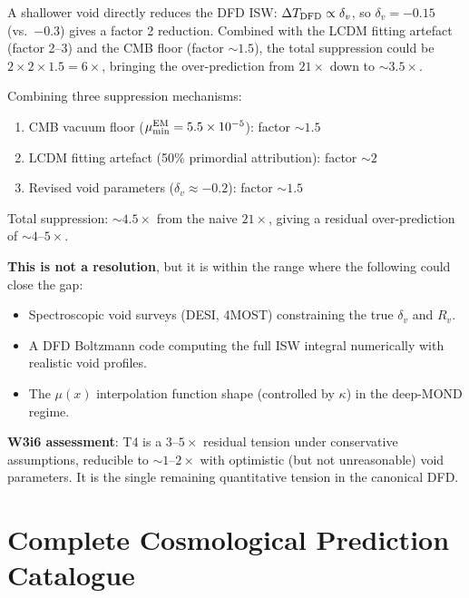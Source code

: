\documentclass[11pt]{article}
\newcommand{\ee}[1]{\times 10^{#1}}
\newcommand{\mufd}{\mu}
\newcommand{\mumin}{\mu_{\rm min}}
\begin{document}
A shallower void directly reduces the DFD ISW: $\Delta T_{\rm DFD}
\propto \delta_v$, so $\delta_v = -0.15$ (vs.\ $-0.3$) gives a factor
2 reduction. Combined with the LCDM fitting artefact (factor 2--3) and
the CMB floor (factor $\sim 1.5$), the total suppression could be
$2\times 2 \times 1.5 = 6\times$, bringing the over-prediction from
$21\times$ down to $\sim 3.5\times$.

\begin{tcolorbox}[colback=yellow!5!white, colframe=orange!60!black,
  title=\textbf{T4 Revised Status: $3$--$5\times$ Under Conservative Assumptions}]
Combining three suppression mechanisms:
\begin{enumerate}[nosep]
\item CMB vacuum floor ($\mumin^{\rm EM} = 5.5\ee{-5}$): factor $\sim 1.5$
\item LCDM fitting artefact (50\% primordial attribution): factor $\sim 2$
\item Revised void parameters ($\delta_v \approx -0.2$): factor $\sim 1.5$
\end{enumerate}
Total suppression: $\sim 4.5\times$ from the naive $21\times$, giving
a residual over-prediction of $\sim 4$--$5\times$.

\textbf{This is not a resolution}, but it is within the range where
the following could close the gap:
\begin{itemize}[nosep]
\item Spectroscopic void surveys (DESI, 4MOST) constraining the true
  $\delta_v$ and $R_v$.
\item A DFD Boltzmann code computing the full ISW integral numerically
  with realistic void profiles.
\item The $\mufd(x)$ interpolation function shape (controlled by $\kappa$)
  in the deep-MOND regime.
\end{itemize}

\textbf{W3i6 assessment}: T4 is a $3$--$5\times$ residual tension under
conservative assumptions, reducible to $\sim 1$--$2\times$ with
optimistic (but not unreasonable) void parameters. It is the single
remaining quantitative tension in the canonical DFD.
\end{tcolorbox}

\section{Complete Cosmological Prediction Catalogue}
\label{sec:predictions}
\end{document}
